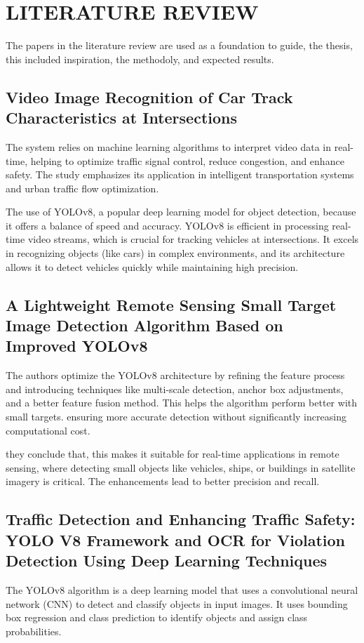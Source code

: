 \chapter{LITERATURE REVIEW}

The papers in the literature review are used as a foundation to guide, the thesis, this included inspiration, the methodoly, and expected results.

\section{Video Image Recognition of Car Track Characteristics at Intersections \cite{paper_1}} 

The system relies on machine learning algorithms to interpret video data in real-time, helping to optimize traffic signal control, reduce congestion, and enhance safety. The study emphasizes its application in intelligent transportation systems and urban traffic flow optimization.

The use of YOLOv8, a popular deep learning model for object detection, because it offers a balance of speed and accuracy. YOLOv8 is efficient in processing real-time video streams, which is crucial for tracking vehicles at intersections. It excels in recognizing objects (like cars) in complex environments, and its architecture allows it to detect vehicles quickly while maintaining high precision.

\newpage
\section{A Lightweight Remote Sensing Small Target Image Detection Algorithm Based on Improved YOLOv8 \cite{paper_2}}
The authors optimize the YOLOv8 architecture by refining the feature  process and introducing techniques like multi-scale detection, anchor box adjustments, and a better feature fusion method. This helps the algorithm perform better with small targets.
ensuring more accurate detection without significantly increasing computational cost.

they conclude that, this makes it suitable for real-time applications in remote sensing, where detecting small objects like vehicles, ships, or buildings in satellite imagery is critical. The enhancements lead to better precision and recall.


\section{Traffic Detection and Enhancing Traffic Safety: YOLO V8 Framework and OCR for Violation Detection Using Deep Learning Techniques \cite{paper_3}}
The YOLOv8 algorithm is a deep learning model that uses a convolutional neural network (CNN) to detect and classify objects in input images. It uses bounding box regression and class prediction to identify objects and assign class probabilities. 


